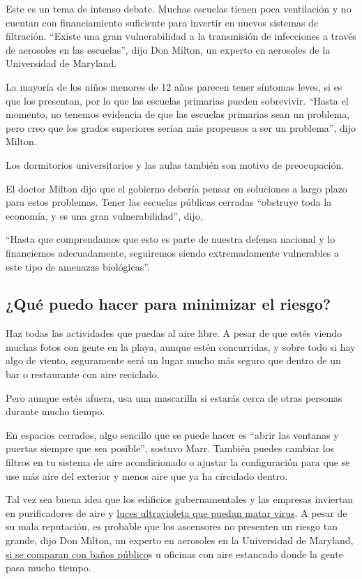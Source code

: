 Este es un tema de intenso debate. Muchas escuelas tienen poca
ventilación y no cuentan con financiamiento suficiente para invertir en
nuevos sistemas de filtración. ``Existe una gran vulnerabilidad a la
transmisión de infecciones a través de aerosoles en las escuelas'', dijo
Don Milton, un experto en aerosoles de la Universidad de Maryland.

La mayoría de los niños menores de 12 años parecen tener síntomas leves,
si es que los presentan, por lo que las escuelas primarias pueden
sobrevivir. ``Hasta el momento, no tenemos evidencia de que las escuelas
primarias sean un problema, pero creo que los grados superiores serían
más propensos a ser un problema'', dijo Milton.

Los dormitorios universitarios y las aulas también son motivo de
preocupación.

El doctor Milton dijo que el gobierno debería pensar en soluciones a
largo plazo para estos problemas. Tener las escuelas públicas cerradas
``obstruye toda la economía, y es una gran vulnerabilidad'', dijo.

``Hasta que comprendamos que esto es parte de nuestra defensa nacional y
lo financiemos adecuadamente, seguiremos siendo extremadamente
vulnerables a este tipo de amenazas biológicas''.

\hypertarget{quuxe9-puedo-hacer-para-minimizar-el-riesgo}{%
\subsection{¿Qué puedo hacer para minimizar el
riesgo?}\label{quuxe9-puedo-hacer-para-minimizar-el-riesgo}}

Haz todas las actividades que puedas al aire libre. A pesar de que estés
viendo muchas fotos con gente en la playa, aunque estén concurridas, y
sobre todo si hay algo de viento, seguramente será un lugar mucho más
seguro que dentro de un bar o restaurante con aire reciclado.

Pero aunque estés afuera, usa una mascarilla si estarás cerca de otras
personas durante mucho tiempo.

En espacios cerrados, algo sencillo que se puede hacer es ``abrir las
ventanas y puertas siempre que sea posible'', sostuvo Marr. También
puedes cambiar los filtros en tu sistema de aire acondicionado o ajustar
la configuración para que se use más aire del exterior y menos aire que
ya ha circulado dentro.

Tal vez sea buena idea que los edificios gubernamentales y las empresas
inviertan en purificadores de aire y
\href{https://www.nytimes3xbfgragh.onion/2020/05/07/science/ultraviolet-light-coronavirus.html}{luces
ultravioleta que puedan matar virus}. A pesar de su mala reputación, es
probable que los ascensores no presenten un riesgo tan grande, dijo Don
Milton, un experto en aerosoles en la Universidad de Maryland,
\href{https://www.nytimes3xbfgragh.onion/es/2020/06/19/espanol/coronavirus-infeccion-inodoro.html}{si
se comparan con baños público}s u oficinas con aire estancado donde la
gente pasa mucho tiempo.

